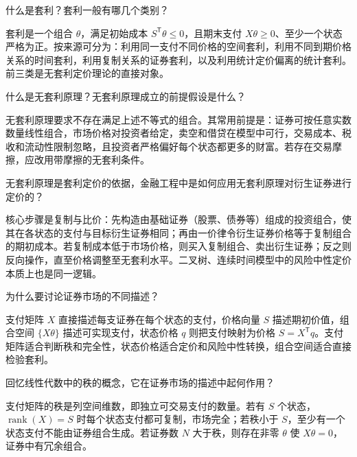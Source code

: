 
\begin{problem}
 什么是套利？套利一般有哪几个类别？
\end{problem}
\begin{solution}
套利是一个组合 $\theta$，满足初始成本 $S^{\mathsf T}\theta\le0$，且期末支付 $X\theta\ge0$、至少一个状态严格为正。按来源可分为：利用同一支付不同价格的空间套利，利用不同到期价格关系的时间套利，利用复制关系的证券套利，以及利用统计定价偏离的统计套利。前三类是无套利定价理论的直接对象。
\end{solution}
\begin{problem}
 什么是无套利原理？无套利原理成立的前提假设是什么？
\end{problem}
\begin{solution}
无套利原理要求不存在满足上述不等式的组合。其常用前提是：证券可按任意实数数量线性组合，市场价格对投资者给定，卖空和借贷在模型中可行，交易成本、税收和流动性限制忽略，且投资者严格偏好每个状态都更多的财富。若存在交易摩擦，应改用带摩擦的无套利条件。
\end{solution}
\begin{problem}
 无套利原理是套利定价的依据，金融工程中是如何应用无套利原理对衍生证券进行定价的？
\end{problem}
\begin{solution}
核心步骤是复制与比价：先构造由基础证券（股票、债券等）组成的投资组合，使其在各状态的支付与目标衍生证券相同；再由一价律令衍生证券价格等于复制组合的期初成本。若复制成本低于市场价格，则买入复制组合、卖出衍生证券；反之则反向操作，直至价格调整至无套利水平。二叉树、连续时间模型中的风险中性定价本质上也是同一逻辑。
\end{solution}
\begin{problem}
 为什么要讨论证券市场的不同描述？
\end{problem}
\begin{solution}
支付矩阵 $X$ 直接描述每支证券在每个状态的支付，价格向量 $S$ 描述期初价值，组合空间 $\{X\theta\}$ 描述可实现支付，状态价格 $q$ 则把支付映射为价格 $S=X^{\mathsf T}q$。支付矩阵适合判断秩和完全性，状态价格适合定价和风险中性转换，组合空间适合直接检验套利。
\end{solution}
\begin{problem}
 回忆线性代数中的秩的概念，它在证券市场的描述中起何作用？
\end{problem}
\begin{solution}
支付矩阵的秩是列空间维数，即独立可交易支付的数量。若有 $S$ 个状态，$\operatorname{rank}(X)=S$ 时每个状态支付都可复制，市场完全；若秩小于 $S$，至少有一个状态支付不能由证券组合生成。若证券数 $N$ 大于秩，则存在非零 $\theta$ 使 $X\theta=0$，证券中有冗余组合。
\end{solution}
